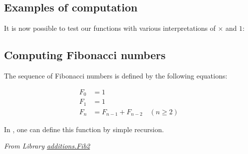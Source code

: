 \subsection{Examples of computation}
It is now possible to test our functions with various interpretations of
$\times$ and $1$:











\subsection{Computing Fibonacci numbers}

The sequence of Fibonacci numbers is defined by the following equations:

\begin{align}
F_0 & = 1 \\
F_1 & = 1 \\
F_n & = F_{n-1} + F_{n-2} \quad (n \geq 2)
\end{align}


In \coq{}, one can define this function by simple recursion.

\emph{From Library
\href{../theories/html/additions.Fib2.html}{additions.Fib2}}


